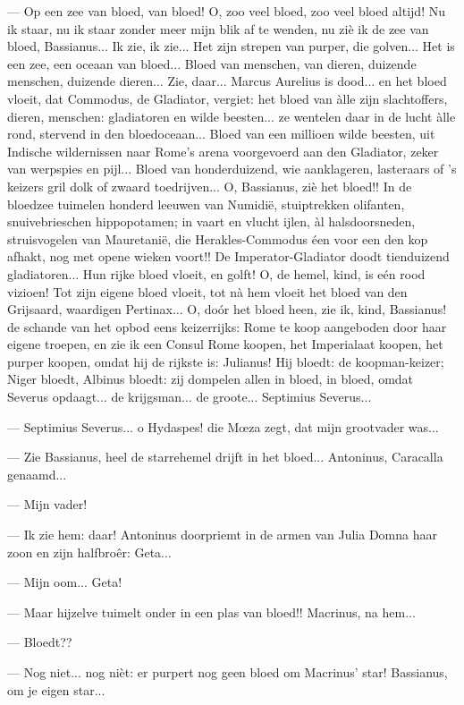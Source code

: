 \documentclass[a4paper, 12pt, oneside, dutch]{article}
\begin{document}
--- Op een zee van bloed, van bloed! O, zoo veel bloed, zoo veel bloed altijd! Nu ik staar, nu ik staar zonder meer mijn blik af te wenden, nu ziè ik de zee van bloed, Bassianus... Ik zie, ik zie... Het zijn strepen van purper, die golven... Het is een zee, een oceaan van bloed... Bloed van menschen, van dieren, duizende menschen, duizende dieren... Zie, daar... Marcus Aurelius is dood... en het bloed vloeit, dat Commodus, de Gladiator, vergiet: het bloed van àlle zijn slachtoffers, dieren, menschen: gladiatoren en wilde beesten... ze wentelen daar in de lucht àlle rond, stervend in den bloedoceaan... Bloed van een millioen wilde beesten, uit Indische wildernissen naar Rome's arena voorgevoerd aan den Gladiator, zeker van werpspies en pijl... Bloed van honderduizend, wie aanklageren, lasteraars of 's keizers gril dolk of zwaard toedrijven... O, Bassianus, ziè het bloed!! In de bloedzee tuimelen honderd leeuwen van Numidië, stuiptrekken olifanten, snuivebrieschen hippopotamen; in vaart en vlucht ijlen, àl halsdoorsneden, struisvogelen van Mauretanië, die Herakles-Commodus éen voor een den kop afhakt, nog met opene wieken voort!! De Imperator-Gladiator doodt tienduizend gladiatoren... Hun rijke bloed vloeit, en golft! O, de hemel, kind, is eén rood vizioen! Tot zijn eigene bloed vloeit, tot nà hem vloeit het bloed van den Grijsaard, waardigen Pertinax... O, doór het bloed heen, zie ik, kind, Bassianus! de schande van het opbod eens keizerrijks: Rome te koop aangeboden door haar eigene troepen, en zie ik een Consul Rome koopen, het Imperialaat koopen, het purper koopen, omdat hij de rijkste is: Julianus! Hij bloedt: de koopman-keizer; Niger bloedt, Albinus bloedt: zij dompelen allen in bloed, in bloed, omdat Severus opdaagt... de krijgsman... de groote... Septimius Severus...

--- Septimius Severus... o Hydaspes! die Mœza zegt, dat mijn grootvader was...

--- Zie Bassianus, heel de starrehemel drijft in het bloed... Antoninus, Caracalla genaamd...

--- Mijn vader!

--- Ik zie hem: daar! Antoninus doorpriemt in de armen van Julia Domna haar zoon en zijn halfbroêr: Geta...

--- Mijn oom... Geta!

--- Maar hijzelve tuimelt onder in een plas van bloed!! Macrinus, na hem...

--- Bloedt??

--- Nog niet... nog nièt: er purpert nog geen bloed om Macrinus' star! Bassianus, om je eigen star...
\end{document}
